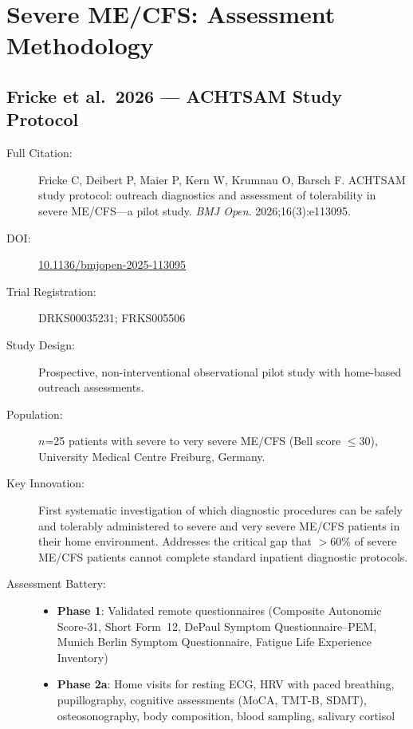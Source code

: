\section{Severe ME/CFS: Assessment Methodology}
\label{sec:bib-severe-assessment}

\subsection{Fricke et al.\ 2026 --- ACHTSAM Study Protocol}

\begin{description}
    \item[Full Citation:] Fricke C, Deibert P, Maier P, Kern W, Krumnau O, Barsch F. ACHTSAM study protocol: outreach diagnostics and assessment of tolerability in severe ME/CFS---a pilot study. \textit{BMJ Open}. 2026;16(3):e113095. \cite{Fricke2026achtsam}
    \item[DOI:] \href{https://doi.org/10.1136/bmjopen-2025-113095}{10.1136/bmjopen-2025-113095}
    \item[Trial Registration:] DRKS00035231; FRKS005506
    \item[Study Design:] Prospective, non-interventional observational pilot study with home-based outreach assessments.
    \item[Population:] $n$=25 patients with severe to very severe ME/CFS (Bell score $\leq$30), University Medical Centre Freiburg, Germany.
    \item[Key Innovation:] First systematic investigation of which diagnostic procedures can be safely and tolerably administered to severe and very severe ME/CFS patients in their home environment. Addresses the critical gap that $>$60\% of severe ME/CFS patients cannot complete standard inpatient diagnostic protocols.
    \item[Assessment Battery:]
    \begin{itemize}
        \item \textbf{Phase 1}: Validated remote questionnaires (Composite Autonomic Score-31, Short Form~12, DePaul Symptom Questionnaire--PEM, Munich Berlin Symptom Questionnaire, Fatigue Life Experience Inventory)
        \item \textbf{Phase 2a}: Home visits for resting ECG, HRV with paced breathing, pupillography, cognitive assessments (MoCA, TMT-B, SDMT), osteosonography, body composition, blood sampling, salivary cortisol

\end{itemize}
\end{description}
